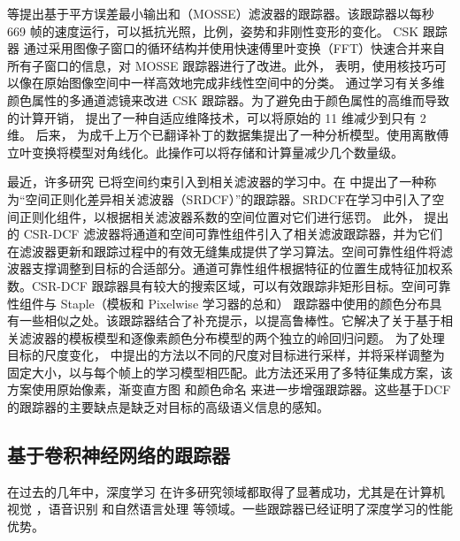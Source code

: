 \cite{bolme2010visual} 等提出基于平方误差最小输出和（MOSSE）滤波器的跟踪器。该跟踪器以每秒 669 帧的速度运行，可以抵抗光照，比例，姿势和非刚性变形的变化。
CSK 跟踪器 \cite{Henriques2012ExploitingTC} 通过采用图像子窗口的循环结构并使用快速傅里叶变换（FFT）快速合并来自所有子窗口的信息，对 MOSSE 跟踪器进行了改进。此外， \cite{Henriques2012ExploitingTC} 表明，使用核技巧可以像在原始图像空间中一样高效地完成非线性空间中的分类。
\cite{Danelljan2014AdaptiveCA} 通过学习有关多维颜色属性的多通道滤镜来改进 CSK 跟踪器。为了避免由于颜色属性的高维而导致的计算开销，\cite{Danelljan2014AdaptiveCA} 提出了一种自适应维降技术，可以将原始的 11 维减少到只有 2 维。
后来，\cite{henriques2014high-speed} 为成千上万个已翻译补丁的数据集提出了一种分析模型。使用离散傅立叶变换将模型对角线化。此操作可以将存储和计算量减少几个数量级。

最近，许多研究 \cite{Danelljan2015LearningSR, Lukezic2017DiscriminativeCF} 已将空间约束引入到相关滤波器的学习中。在 \cite{Danelljan2015LearningSR} 中提出了一种称为“空间正则化差异相关滤波器（SRDCF）”的跟踪器。SRDCF在学习中引入了空间正则化组件，以根据相关滤波器系数的空间位置对它们进行惩罚。
此外，\cite{Lukezic2017DiscriminativeCF} 提出的 CSR-DCF 滤波器将通道和空间可靠性组件引入了相关滤波跟踪器，并为它们在滤波器更新和跟踪过程中的有效无缝集成提供了学习算法。空间可靠性组件将滤波器支撑调整到目标的合适部分。通道可靠性组件根据特征的位置生成特征加权系数。CSR-DCF 跟踪器具有较大的搜索区域，可以有效跟踪非矩形目标。空间可靠性组件与 Staple（模板和 Pixelwise 学习器的总和） \cite{Bertinetto2016StapleC} 跟踪器中使用的颜色分布具有一些相似之处。该跟踪器结合了补充提示，以提高鲁棒性。它解决了关于基于相关滤波器的模板模型和逐像素颜色分布模型的两个独立的岭回归问题。
为了处理目标的尺度变化， \cite{Li2014ASA} 中提出的方法以不同的尺度对目标进行采样，并将采样调整为固定大小，以与每个帧上的学习模型相匹配。此方法还采用了多特征集成方案，该方案使用原始像素，渐变直方图 \cite{Forsyth2014ObjectDW} 和颜色命名 \cite{Weijer2009LearningCN} 来进一步增强跟踪器。这些基于DCF的跟踪器的主要缺点是缺乏对目标的高级语义信息的感知。

\subsection{基于卷积神经网络的跟踪器}
在过去的几年中，深度学习 \cite{Goodfellow2015DeepL} 在许多研究领域都取得了显著成功，尤其是在计算机视觉 \cite{Matiz2019InductiveCP, Zhu2019RotatedCR, Xiao2019DenseSE}，语音识别 \cite{Kim2016JointCB, Liu2019AttentionGD}和自然语言处理 \cite{Vinyals2014GrammarAA, Yousfi2017ContributionOR} 等领域。一些跟踪器已经证明了深度学习的性能优势。

